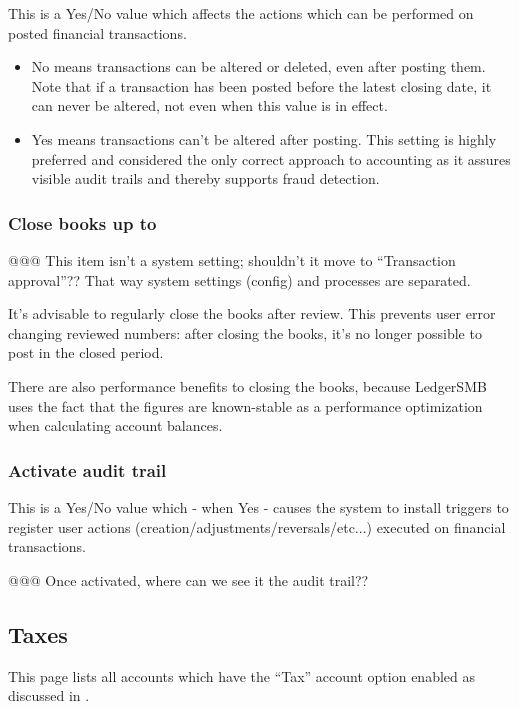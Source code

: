This is a Yes/No value which affects the actions which can be performed on posted financial transactions.
\begin{itemize}
\item No means transactions can be altered or deleted, even after posting them. Note that
if a transaction has been posted before the latest closing date, it can never be altered,
not even when this value is in effect.
\item Yes means transactions can't be altered after posting. This setting is highly preferred and considered the only correct approach to accounting as it assures visible
audit trails and thereby supports fraud detection.
\end{itemize}

\subsubsection{Close books up to}

@@@ This item isn't a system setting; shouldn't it move to ``Transaction approval''?? That way system settings (config) and processes are separated.

It's advisable to regularly close the books after review. This prevents user error changing
reviewed numbers: after closing the books, it's no longer possible to post in the closed
period.

There are also performance benefits to closing the books, because LedgerSMB uses the
fact that the figures are known-stable as a performance optimization when calculating
account balances.

\subsubsection{Activate audit trail}

This is a Yes/No value which - when Yes - causes the system to install triggers to register
user actions (creation/adjustments/reversals/etc...) executed on financial transactions.


@@@ Once activated, where can we see it the audit trail??


\subsection{Taxes}

This page lists all accounts which have the ``Tax'' account option enabled as discussed in .

